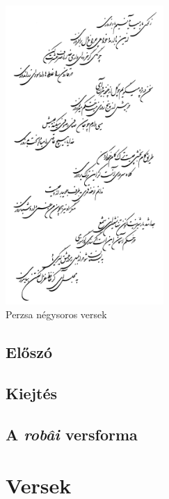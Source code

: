 

\frontmatter
{}

\begin{titlepage}
\centering
\includegraphics[width=6cm]{hafez.png}\\
\vspace{\fill}
{\LARGE Perzsa négysoros versek}
\end{titlepage}





\chapter*{Előszó}


\chapter*{Kiejtés}


\chapter*{A \emph{robâi} versforma}


\mainmatter
{}
\part*{Versek}


\tableofcontents


